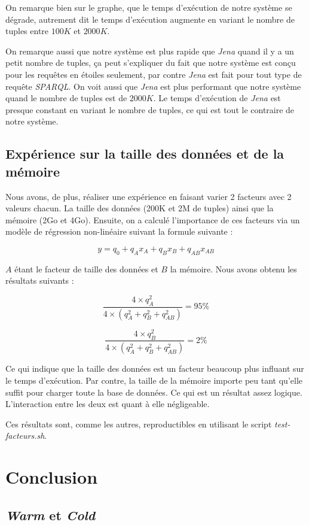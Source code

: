 \documentclass[12pt,titlepage]{article}
\begin{document}
On remarque bien sur le graphe, que le temps d'exécution de notre système se dégrade, autrement dit le temps d'exécution augmente en variant le nombre de tuples entre $100K$ et $2000K$.

On remarque aussi que notre système est plus rapide que \textit{Jena} quand il y a un petit nombre de tuples, ça peut s'expliquer du fait que notre système est conçu pour les requêtes en étoiles seulement, par contre \textit{Jena} est fait pour tout type de requête \textit{SPARQL}. On voit aussi que \textit{Jena} est plus performant que notre système quand le nombre de tuples est de $2000K$. Le temps d'exécution de \textit{Jena} est presque constant en variant le nombre de tuples, ce qui est tout le contraire de notre système.

\subsection{Expérience sur la taille des données et de la mémoire}

Nous avons, de plus, réaliser une expérience en faisant varier 2 facteurs avec 2 valeurs chacun. La taille des données (200K et 2M de tuples) ainsi que la mémoire (2Go et 4Go). Ensuite, on a calculé l'importance de ces facteurs via un modèle de régression non-linéaire suivant la formule suivante :

\[
  y = q_0 + q_A x_A + q_B x_B + q_{AB} x_{AB}
\]

$A$ étant le facteur de taille des données et $B$ la mémoire. Nous avons obtenu les résultats suivants : 

\[
  \frac{4\times q_A^2}{4 \times  (q_A^2 + q_B^2 + q_{AB}^2)} = 95\%
\]

\[
  \frac{4\times q_B^2}{4 \times  (q_A^2 + q_B^2 + q_{AB}^2)} = 2\%
\]

Ce qui indique que la taille des données est un facteur beaucoup plus influant sur le temps d'exécution. Par contre, la taille de la mémoire importe peu tant qu'elle suffit pour charger toute la base de données. Ce qui est un résultat assez logique. L'interaction entre les deux est quant à elle négligeable.
 
Ces résultats sont, comme les autres, reproductibles en utilisant le script \textit{test-facteurs.sh}.

\section{Conclusion}

\subsection{\textit{Warm} et \textit{Cold}}
\end{document}
